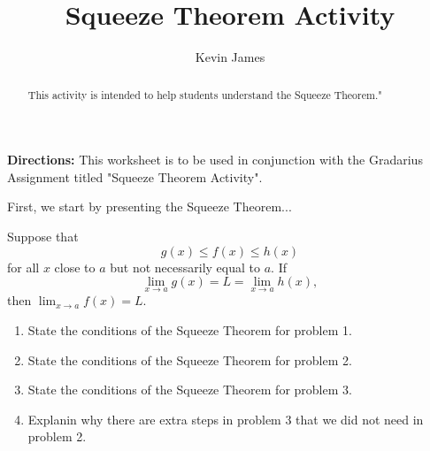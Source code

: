 \documentclass[handout,nooutcomes,noauthor]{Ximera}
\author{Kevin James}
\title{Squeeze Theorem Activity}
\begin{document}
	\begin{abstract}
		This activity is intended to help students understand the Squeeze Theorem."
	\end{abstract}
	\maketitle
	\textbf{Directions:}  This worksheet is to be used in conjunction with the Gradarius Assignment titled "Squeeze Theorem Activity".
	
	First, we start by presenting the Squeeze Theorem...
	
	\begin{theorem}
		Suppose that
		\[
		g(x) \le f(x) \le h(x)
		\]
		for all $x$ close to $a$ but not necessarily equal to $a$. If
		\[
		\lim_{x\to a} g(x) = L = \lim_{x\to a} h(x),
		\]
		then $\lim_{x\to a} f(x) = L$.
	\end{theorem}
	\begin{enumerate}[label=\arabic*]
		\item State the conditions of the Squeeze Theorem for problem 1.
		
		\clearpage
		
		\item State the conditions of the Squeeze Theorem for problem 2.
		\item State the conditions of the Squeeze Theorem for problem 3.
		\item Explanin why there are extra steps in problem 3 that we did not need in problem 2.
	\end{enumerate}
\end{document}
